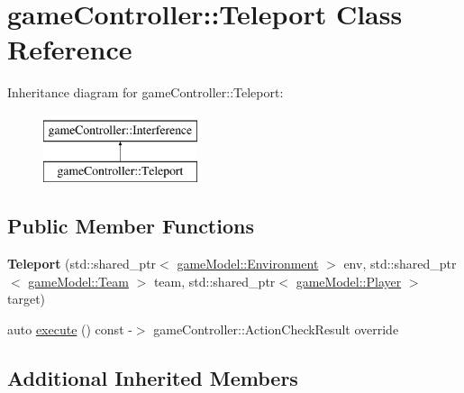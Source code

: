 \hypertarget{classgame_controller_1_1_teleport}{\section{game\-Controller\-:\-:Teleport Class Reference}
\label{classgame_controller_1_1_teleport}
}
Inheritance diagram for game\-Controller\-:\-:Teleport\-:\begin{figure}[H]
\begin{center}
\leavevmode
\includegraphics[height=2.000000cm]{classgame_controller_1_1_teleport}
\end{center}
\end{figure}
\subsection*{Public Member Functions}
\begin{DoxyCompactItemize}
\item 
\hypertarget{classgame_controller_1_1_teleport_ad427f67456586b006eb15142a96435df}{{\bfseries Teleport} (std\-::shared\-\_\-ptr$<$ \hyperlink{classgame_model_1_1_environment}{game\-Model\-::\-Environment} $>$ env, std\-::shared\-\_\-ptr$<$ \hyperlink{classgame_model_1_1_team}{game\-Model\-::\-Team} $>$ team, std\-::shared\-\_\-ptr$<$ \hyperlink{classgame_model_1_1_player}{game\-Model\-::\-Player} $>$ target)}\label{classgame_controller_1_1_teleport_ad427f67456586b006eb15142a96435df}

\item 
auto \hyperlink{classgame_controller_1_1_teleport_a8afb230cf709b514e549ebe73f1fc68e}{execute} () const -\/$>$ game\-Controller\-::\-Action\-Check\-Result override
\end{DoxyCompactItemize}
\subsection*{Additional Inherited Members}


